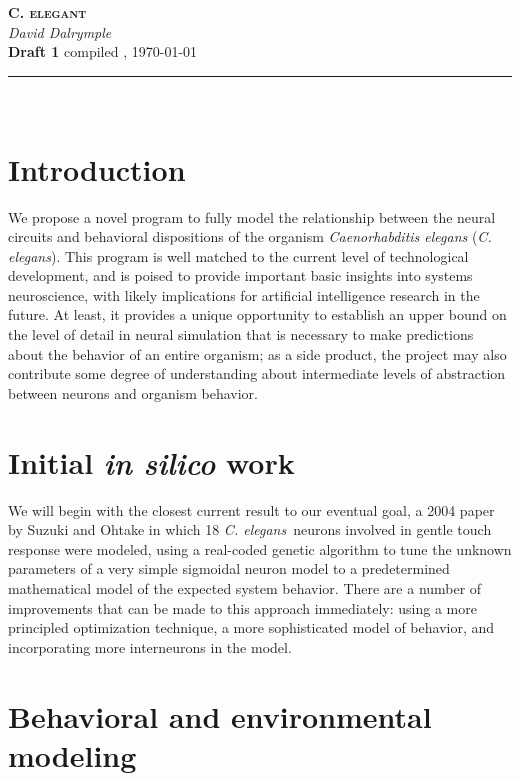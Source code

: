 \documentclass[letter,11pt]{article}
\newcommand{\cel}{{\em C. elegans}}
\begin{document}
\begin{center}
	\textsc{\LARGE \bfseries C. elegant}\\[1mm]
	\textit{David Dalrymple}\\[1mm]
	{\small {\bfseries \color{red} Draft 1} compiled \currenttime, \today\\[0mm]}
	\rule[2mm]{0.66\textwidth}{0.25mm}\\[10mm]
\end{center}

\section*{Introduction}

We propose a novel program to fully model the relationship between the neural circuits and behavioral dispositions of the organism {\em Caenorhabditis elegans} (\cel).
This program is well matched to the current level of technological development, and is poised to provide important basic insights into systems neuroscience, with
likely implications for artificial intelligence research in the future. At least, it provides a unique opportunity to establish an upper bound on the level
of detail in neural simulation that is necessary to make predictions about the behavior of an entire organism; as a side product, the project may also contribute
some degree of understanding about intermediate levels of abstraction between neurons and organism behavior.

\section*{Initial {\em in silico} work}

We will begin with the closest current result to our eventual goal, a 2004
paper by Suzuki and Ohtake in which 18 \cel\ neurons involved in gentle touch
response were modeled, using a real-coded genetic algorithm to tune the unknown
parameters of a very simple sigmoidal neuron model to a predetermined mathematical
model of the expected system behavior. There are a number of improvements that
can be made to this approach immediately: using a more principled optimization
technique, a more sophisticated model of behavior, and incorporating more
interneurons in the model.

\section*{Behavioral and environmental modeling}
\end{document}
